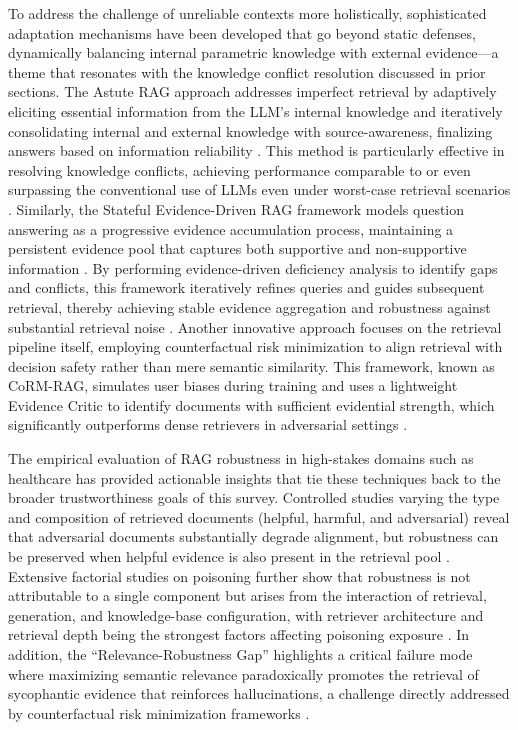 \documentclass[11pt]{article}
\begin{document}
To address the challenge of unreliable contexts more holistically, sophisticated adaptation mechanisms have been developed that go beyond static defenses, dynamically balancing internal parametric knowledge with external evidence---a theme that resonates with the knowledge conflict resolution discussed in prior sections. The Astute RAG approach addresses imperfect retrieval by adaptively eliciting essential information from the LLM's internal knowledge and iteratively consolidating internal and external knowledge with source-awareness, finalizing answers based on information reliability \cite{ref215}. This method is particularly effective in resolving knowledge conflicts, achieving performance comparable to or even surpassing the conventional use of LLMs even under worst-case retrieval scenarios \cite{ref215}. Similarly, the Stateful Evidence-Driven RAG framework models question answering as a progressive evidence accumulation process, maintaining a persistent evidence pool that captures both supportive and non-supportive information \cite{ref216}. By performing evidence-driven deficiency analysis to identify gaps and conflicts, this framework iteratively refines queries and guides subsequent retrieval, thereby achieving stable evidence aggregation and robustness against substantial retrieval noise \cite{ref216}. Another innovative approach focuses on the retrieval pipeline itself, employing counterfactual risk minimization to align retrieval with decision safety rather than mere semantic similarity. This framework, known as CoRM-RAG, simulates user biases during training and uses a lightweight Evidence Critic to identify documents with sufficient evidential strength, which significantly outperforms dense retrievers in adversarial settings \cite{ref217}.

The empirical evaluation of RAG robustness in high-stakes domains such as healthcare has provided actionable insights that tie these techniques back to the broader trustworthiness goals of this survey. Controlled studies varying the type and composition of retrieved documents (helpful, harmful, and adversarial) reveal that adversarial documents substantially degrade alignment, but robustness can be preserved when helpful evidence is also present in the retrieval pool \cite{ref218}. Extensive factorial studies on poisoning further show that robustness is not attributable to a single component but arises from the interaction of retrieval, generation, and knowledge-base configuration, with retriever architecture and retrieval depth being the strongest factors affecting poisoning exposure \cite{ref219}. In addition, the ``Relevance-Robustness Gap'' highlights a critical failure mode where maximizing semantic relevance paradoxically promotes the retrieval of sycophantic evidence that reinforces hallucinations, a challenge directly addressed by counterfactual risk minimization frameworks \cite{ref217}.
\end{document}
